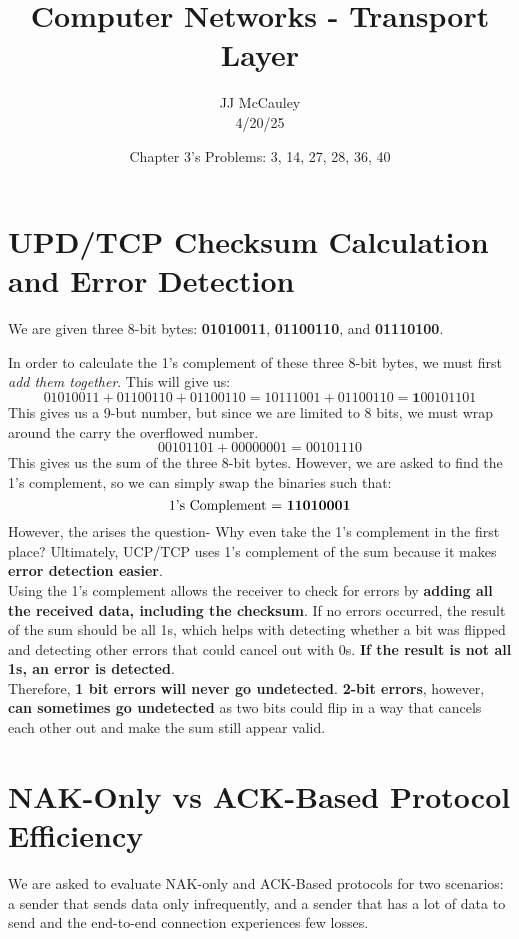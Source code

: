 \documentclass[colorlinks=true, allcolors=blue]{article}
\title{Computer Networks - Transport Layer}
\author{JJ McCauley \\ 4/20/25}
\date{Chapter 3's Problems: 3, 14, 27, 28, 36, 40}
\begin{document}
\maketitle

\setcounter{section}{2}
\section{UPD/TCP Checksum Calculation and Error Detection}
We are given three 8-bit bytes: \textbf{01010011}, \textbf{01100110}, and \textbf{01110100}. 

In order to calculate the 1's complement of these three 8-bit bytes, we must first \textit{add them together}. This will give us:
\[
01010011 + 01100110 + 01100110 = 10111001 + 01100110 =  \textbf{1} 00101101
\]
This gives us a 9-but number, but since we are limited to 8 bits, we must wrap around the carry the overflowed number.
\[
00101101 + 00000001 = 00101110
\]
This gives us the sum of the three 8-bit bytes. However, we are asked to find the 1's complement, so we can simply swap the binaries such that:
\[
\text{1's Complement = \textbf{11010001}}
\]
However, the arises the question- Why even take the 1's complement in the first place? Ultimately, UCP/TCP uses 1's complement of the sum because it makes \textbf{error detection easier}. \\

Using the 1's complement allows the receiver to check for errors by \textbf{adding all the received data, including the checksum}. If no errors occurred, the result of the sum should be all 1s, which helps with detecting whether a bit was flipped and detecting other errors that could cancel out with 0s. \textbf{If the result is not all 1s, an error is detected}. \\

Therefore, \textbf{1 bit errors will never go undetected}. \textbf{2-bit errors}, however, \textbf{can sometimes go undetected} as two bits could flip in a way that cancels each other out and make the sum still appear valid.

\setcounter{section}{13}
\section{NAK-Only vs ACK-Based Protocol Efficiency}
We are asked to evaluate NAK-only and ACK-Based protocols for two scenarios: a sender that sends data only infrequently, and a sender that has a lot of data to send and the end-to-end connection experiences few losses.
\end{document}
